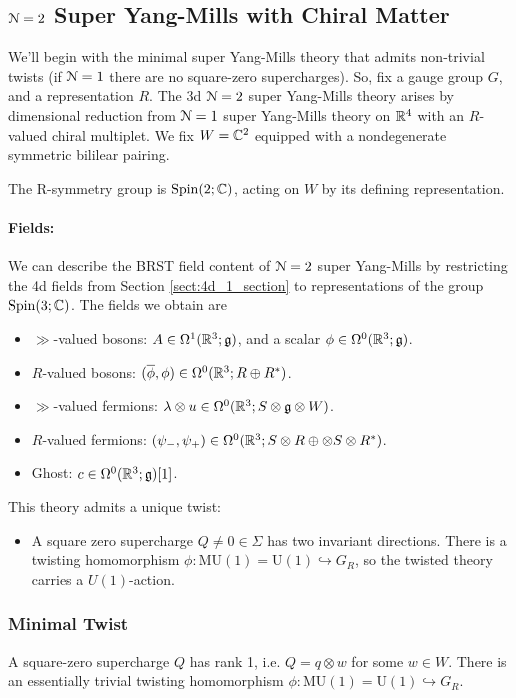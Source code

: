 \documentclass[10pt, oneside]{article}
\newcommand{\MU}{\mathrm{MU}}
\renewcommand{\U}{\mathrm{U}}
\begin{document}
\subsection{\texorpdfstring{$\mathcal N = 2$}{N=2} Super Yang-Mills with Chiral Matter} 
\label{sect:3d_2_section}
We'll begin with the minimal super Yang-Mills theory that admits non-trivial twists (if $\mathcal{N}=1$ there are no square-zero supercharges).  So, fix a gauge group $G$, and a representation $R$.  The 3d $\mathcal{N}=2$ super Yang-Mills theory arises by dimensional reduction from $\mathcal{N}=1$ super Yang-Mills theory on $\mathbb R^4$ with an $R$-valued chiral multiplet.  We fix $W = \mathbb C^2$ equipped with a nondegenerate symmetric bililear pairing.

The R-symmetry group is $\mathrm{Spin}(2;\mathbb C)$, acting on $W$ by its defining representation. 

\vspace{-10pt}
\paragraph{Fields:} We can describe the BRST field content of $\mathcal{N}=2$ super Yang-Mills by restricting the 4d fields from Section \ref{sect:4d_1_section} to representations of the group $\mathrm{Spin}(3;\mathbb C)$.  The fields we obtain are
\begin{itemize}
 \item $\gg$-valued bosons: $A \in \Omega^1(\mathbb R^3; \mathfrak{g})$, and a scalar $\phi \in \Omega^0(\mathbb R^3; \mathfrak{g})$.
 \item $R$-valued bosons: $(\overline{\phi}, \phi) \in \Omega^0(\mathbb R^3 ; R \oplus R^*)$.
 \item $\gg$-valued fermions: $\lambda \otimes u \in \Omega^0(\mathbb R^3 ; S \otimes \mathfrak{g} \otimes W)$.
 \item $R$-valued fermions: $(\psi_-,\psi_+) \in \Omega^0(\mathbb R^3 ; S \otimes R \oplus \otimes S \otimes R^*)$.
 \item Ghost: $c \in \Omega^0(\mathbb R^3; \mathfrak{g})[1]$.
\end{itemize}

This theory admits a unique twist:
\begin{itemize}
 \item A square zero supercharge $Q \ne 0 \in \Sigma$ has two invariant directions.  There is a twisting homomorphism $\phi \colon \MU(1) = \U(1)\hookrightarrow G_R$, so the twisted theory carries a $U(1)$-action.
\end{itemize}

\subsubsection{Minimal Twist}
\label{sect:3dminimaltwist}
A square-zero supercharge $Q$ has rank 1, i.e. $Q = q \otimes w$ for some $w \in W$.  There is an essentially trivial twisting homomorphism $\phi \colon \MU(1) = \U(1)\hookrightarrow G_R$.
\end{document}

